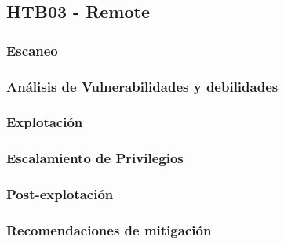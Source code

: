 \subsection{HTB03 - Remote}
\subsubsection{Escaneo}
\subsubsection{Análisis de Vulnerabilidades y debilidades}
\subsubsection{Explotación}
\subsubsection{Escalamiento de Privilegios}
\subsubsection{Post-explotación}
\subsubsection{Recomendaciones de mitigación}